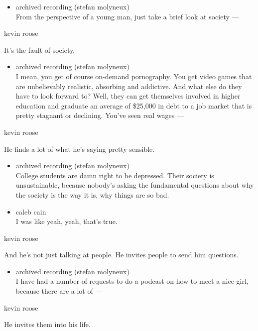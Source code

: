 \begin{itemize}
\tightlist
\item
  archived recording (stefan molyneux)\\
  From the perspective of a young man, just take a brief look at society
  ---
\end{itemize}

kevin roose

It's the fault of society.

\begin{itemize}
\tightlist
\item
  archived recording (stefan molyneux)\\
  I mean, you get of course on-demand pornography. You get video games
  that are unbelievably realistic, absorbing and addictive. And what
  else do they have to look forward to? Well, they can get themselves
  involved in higher education and graduate an average of \$25,000 in
  debt to a job market that is pretty stagnant or declining. You've seen
  real wages ---
\end{itemize}

kevin roose

He finds a lot of what he's saying pretty sensible.

\begin{itemize}
\item
  archived recording (stefan molyneux)\\
  College students are damn right to be depressed. Their society is
  unsustainable, because nobody's asking the fundamental questions about
  why the society is the way it is, why things are so bad.
\item
  caleb cain\\
  I was like yeah, yeah, that's true.
\end{itemize}

kevin roose

And he's not just talking at people. He invites people to send him
questions.

\begin{itemize}
\tightlist
\item
  archived recording (stefan molyneux)\\
  I have had a number of requests to do a podcast on how to meet a nice
  girl, because there are a lot of ---
\end{itemize}

kevin roose

He invites them into his life.

